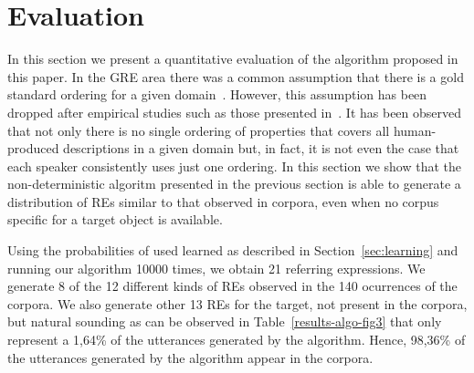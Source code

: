 \section{Evaluation}
\label{sec:evaluation}

In this section we present a quantitative evaluation of the algorithm proposed in this paper. In the GRE area there was a common assumption that there is a gold standard ordering for a given domain~\cite{Dale1995}. However, this assumption has been dropped after empirical studies such as those presented in~\cite{arec2:2008:Areces,viet:gene11}. It has been observed that not only there is no single ordering of properties that covers all human-produced descriptions in a given domain but, in fact, it is not even the case that each speaker consistently uses just one ordering. In this section we show that the non-deterministic algoritm presented in the previous section is able to generate a distribution of REs similar to that observed in corpora, even when no corpus specific for a target object is available. 

Using the probabilities of used learned as described in Section~\ref{sec:learning} and running our algorithm 10000 times, we obtain 21 referring expressions. We generate 8 of the 12 different kinds of REs observed in the 140 ocurrences of the corpora. We also generate other 13 REs for the target, not present in the corpora, but natural sounding as can be observed in Table~\ref{results-algo-fig3} that only represent a 1,64\% of the utterances generated by the algorithm. Hence, 98,36\% of the utterances generated by the algorithm appear in the corpora.  

